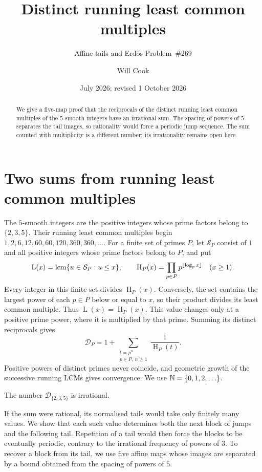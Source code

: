 \documentclass[11pt]{article}
\title{Distinct running least common multiples}
\subtitle{Affine tails and Erd\H{o}s Problem~\#269}
\author{Will Cook}
\date{July 2026; revised 1 October 2026}
\newcommand{\hgt}{\operatorname{H}}
\newcommand{\Lprefix}{\operatorname{L}}
\begin{document}
\maketitle
\noteprovenance

\begin{abstract}
We give a five-map proof that the reciprocals of the distinct running least
common multiples of the $5$-smooth integers have an irrational sum.
The spacing of powers of $5$ separates the tail images, so rationality
would force a periodic jump sequence. The sum counted with multiplicity
is a different number; its irrationality remains open here.
\end{abstract}

\section{Two sums from running least common multiples}\label{sec:problem}
The $5$-smooth integers are the positive integers whose prime factors
belong to $\{2,3,5\}$. Their running least common multiples begin
$1,2,6,12,60,60,120,360,360,\ldots$. For a finite set of primes $P$, let
$\mathcal S_P$ consist of $1$ and all positive integers whose prime factors
belong to $P$, and put
\[
 \Lprefix(x)=\lcm\{u\in\mathcal S_P:u\le x\},\qquad
 \hgt_P(x)=\prod_{p\in P}p^{\lfloor\log_p x\rfloor}\quad(x\ge1).
\]
Every integer in this finite set divides $\hgt_P(x)$. Conversely, the
set contains the largest power of each $p\in P$ below or equal to $x$,
so their product divides its least common multiple. Thus
$\Lprefix(x)=\hgt_P(x)$. This value changes only at a positive prime
power, where it is multiplied by that prime. Summing its distinct
reciprocals gives
\[
 \mathcal D_P=1+\sum_{\substack{t=p^n\\p\in P,\ n\ge1}}\frac1{\hgt_P(t)}.
\]
Positive powers of distinct primes never coincide, and geometric growth
of the successive running LCMs gives convergence. We use $\mathbb{N}=\{0,1,2,\ldots\}$.

\begin{theorem}\label{res:distinct-height-235}
The number $\mathcal D_{\{2,3,5\}}$ is irrational.
\end{theorem}

If the sum were rational, its normalised tails would take only finitely
many values. We show that each such value determines both the next block
of jumps and the following tail. Repetition of a tail would then force
the blocks to be eventually periodic, contrary to the irrational frequency
of powers of $3$. To recover a block from its tail, we use five affine
maps whose images are separated by a bound obtained from the spacing of
powers of $5$.
\end{document}
